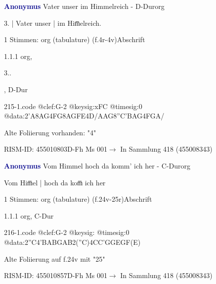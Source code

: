 \documentclass[twocolumn]{book}
\begin{document}
\par \vspace{7pt} \textcolor{darkblue}{\textbf{Anonymus  }}\hfillplus{\textbf{[215]}}\newline Vater unser im Himmelreich - D-Dur\newline org
\par \begin{itshape}[f.4r, at left:] 3. | Vater unser | im Him̅elreich.\end{itshape} 
\par \textcolor{darkblue}{}  1 Stimmen: org (tabulature)  (f.4r-4v)\newline Abschrift
\par 1.1.1  org, \begin{itshape}3..\end{itshape}, D-Dur  
\begin{filecontents*}{215-1.code}
@clef:G-2
@keysig:xFC
@timesig:0
@data:2'A{8AG}4FG{8AG}{FE}4D/AAG{8''C'BAG}4FGA/
\end{filecontents*}
\newline
%
\par Alte Foliierung vorhanden: "4"
\par RISM-ID: 455010803\newline D-Fh  Ms 001\newline $\rightarrow$ In Sammlung 418 (455008343)
      
\par \vspace{7pt} \textcolor{darkblue}{\textbf{Anonymus  }}\hfillplus{\textbf{[216]}}\newline Vom Himmel hoch da komm' ich her - C-Dur\newline org
\par \begin{itshape}[f.24v, at left:] Vom Him̅el | hoch da kom̅ ich her\end{itshape} 
\par \textcolor{darkblue}{}  1 Stimmen: org (tabulature)  (f.24v-25r)\newline Abschrift
\par 1.1.1  org, C-Dur  
\begin{filecontents*}{216-1.code}
@clef:G-2
@keysig:
@timesig:0
@data:2''C4'BABGAB2(''C)4CC'GGEGF(E)
\end{filecontents*}
\newline
%
\par Alte Foliierung auf f.24v mit "25"
\par RISM-ID: 455010857\newline D-Fh  Ms 001\newline $\rightarrow$ In Sammlung 418 (455008343)
      
\end{document}
